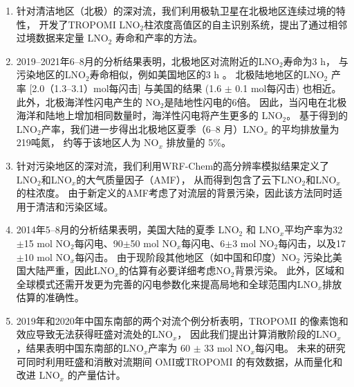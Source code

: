 \begin{enumerate}[label=（\arabic*）, labelindent=\parindent, leftmargin=0pt, widest=0, itemindent=*, topsep=0pt, partopsep=0pt, parsep=0pt]

\item 针对清洁地区（北极）的深对流，我们利用极轨卫星在北极地区连续过境的特性，
开发了TROPOMI LNO$_2$柱浓度高值区的自主识别系统，提出了通过相邻过境数据来定量 LNO$_2$ 寿命和产率的方法。

\item 2019--2021年6--8月的分析结果表明，北极地区对流附近的LNO$_2$寿命为3 h，
与污染地区的LNO$_2$寿命相似，例如美国地区的3 h \citep{Nault.2017}。
北极陆地地区的LNO$_2$ 产率 [2.0（1.3--3.1）mol每闪击] 与美国的结果 (1.6 $\pm$ 0.1 mol每闪击) 也相近\citep{Lapierre.2020}。
此外，北极海洋性闪电产生的 NO$_2$是陆地性闪电的6倍。
因此，当闪电在北极海洋和陆地上增加相同数量时，海洋性闪电将产生更多的 LNO$_2$。
基于得到的LNO$_2$产率，我们进一步得出北极地区夏季（6--8 月）LNO$_x$ 的平均排放量为219吨氮，
约等于该地区人为 NO$_x$ 排放量的 5\%。

\item 针对污染地区的深对流，我们利用WRF-Chem的高分辨率模拟结果定义了LNO$_2$和LNO$_x$的大气质量因子（AMF），
从而得到包含了云下LNO$_2$和LNO$_x$的柱浓度。
由于新定义的AMF考虑了对流层的背景污染，因此该方法同时适用于清洁和污染区域。

\item 2014年5--8月的分析结果表明，美国大陆的夏季 LNO$_2$ 和 LNO$_x$平均产率为32$\pm$15 mol NO$_2$每闪电、90$\pm$50 mol NO$_x$每闪电、6$\pm$3 mol NO$_2$每闪击，以及17$\pm$10 mol NO$_x$每闪击。
由于现阶段其他地区（如中国和印度）NO$_2$ 污染比美国大陆严重，因此LNO$_x$的估算有必要详细考虑NO$_2$背景污染。
此外，区域和全球模式还需开发更为完善的闪电参数化来提高局地和全球范围内LNO$_x$排放估算的准确性。

\item 2019年和2020年中国东南部的两个对流个例分析表明，TROPOMI 的像素饱和效应导致无法获得旺盛对流处的LNO$_x$，
因此我们提出计算消散阶段的LNO$_x$，结果表明中国东南部的LNO$_x$产率为 60 $\pm$ 33 mol NO$_x$每闪电。
未来的研究可同时利用旺盛和消散对流期间 OMI或TROPOMI 的有效数据，从而量化和改进 LNO$_x$ 的产量估计。

\end{enumerate}
